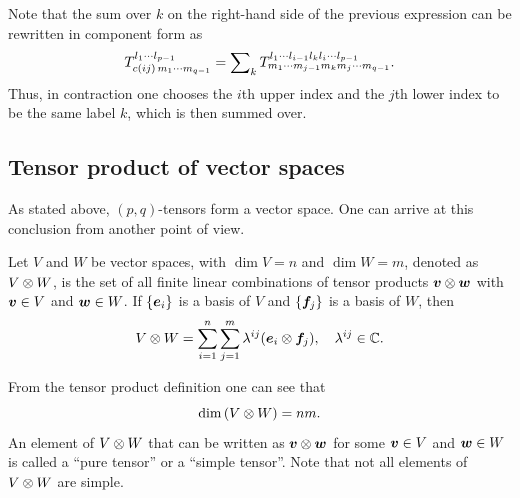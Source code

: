Note that the sum over $k$ on the right-hand side of the previous expression can be rewritten in component form as 
\begin{equation}
    T_{c(ij)\,m_1\cdots m_{q - 1}}^{l_1\cdots l_{p - 1}} = \sum\nolimits_k T^{l_1\cdots l_{i - 1}l_kl_i\cdots l_{p - 1}}_{m_1\cdots m_{j - 1}m_km_j\cdots m_{q - 1}}.
\end{equation}
Thus, in contraction one chooses the $i$th upper index and the $j$th lower index to be the same label $k$, which is then summed over. 

\subsection{Tensor product of vector spaces}
As stated above, $(p,q)$-tensors form a vector space. One can arrive at this conclusion from another point of view.
\begin{defn}
    Let $V$ and $W$ be vector spaces, with $\dim{V} = n$ and $\dim{W} = m$, denoted as $V \otimes W$, is the set of all finite linear combinations of tensor products $\bm{v} \otimes \bm{w}$ with $\bm{v} \in V$ and $\bm{w} \in W$. If $\{\bm{e}_i\}$ is a basis of $V$ and $\{\bm{f}_j\}$ is a basis of $W$, then 
    \begin{equation}
        V \otimes W = \sum_{i=1}^n\sum_{j=1}^m\lambda^{ij}(\bm{e}_i \otimes \bm{f}_j),\quad \lambda^{ij} \in \mathbb{C}.
    \end{equation}
\end{defn}
From the tensor product definition one can see that
\begin{equation}
    \dim{(V \otimes W)} = nm.
\end{equation}
An element of $V \otimes W$ that can be written as $\bm{v} \otimes \bm{w}$ for some $\bm{v} \in V$ and $\bm{w} \in W$ is called a ``pure tensor'' or a ``simple tensor''. Note that not all elements of $V \otimes W$ are simple.
